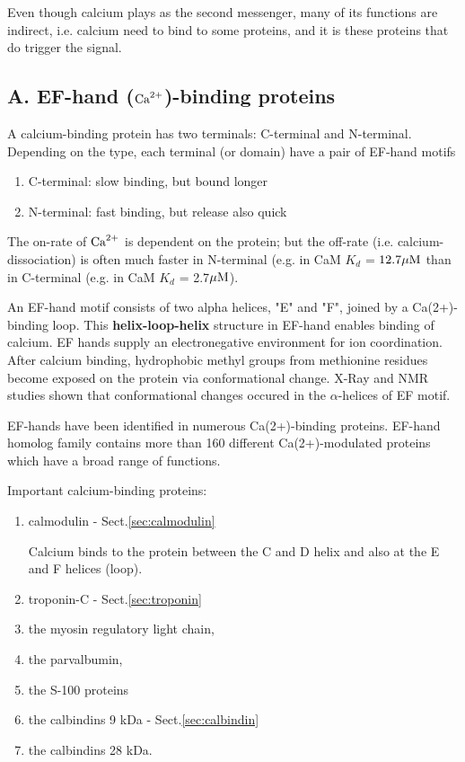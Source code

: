 Even though calcium plays as the second messenger, many of its functions are
indirect, i.e. calcium need to bind to some proteins, and it is these proteins
that do trigger the signal. 

\subsection{A. EF-hand (${\text{Ca}^{2+}}$)-binding proteins}
\label{sec:calcium-binding-proteins-EF-hand}
\label{sec:EF-hand-motif}

A calcium-binding protein has two terminals: C-terminal and N-terminal.
Depending on the type, each terminal (or domain) have a pair of EF-hand
motifs
\begin{enumerate}
  \item C-terminal: slow binding, but bound longer
  
  \item N-terminal: fast binding, but release also quick
\end{enumerate}
The on-rate of ${\text{Ca}^{2+}}$ is dependent on the protein; but the off-rate (i.e.
calcium-dissociation) is often much faster in N-terminal (e.g. in CaM $K_d$
= $12.7 {\mu\text{M}}$ than in C-terminal (e.g. in CaM $K_d$ = 2.7${\mu\text{M}}$).

An EF-hand motif consists of two alpha helices, "E" and "F", joined by a
Ca(2+)-binding loop. This {\bf helix-loop-helix} structure in EF-hand enables
binding of calcium. EF hands supply an electronegative environment for ion
coordination. After calcium binding, hydrophobic methyl groups from methionine
residues become exposed on the protein via conformational change. X-Ray and NMR
studies shown that conformational changes occured in the
 $\alpha$-helices of EF motif.


EF-hands have been identified in numerous Ca(2+)-binding
proteins. EF-hand homolog family contains more than 160 different
Ca(2+)-modulated proteins which have a broad range of functions. 

Important calcium-binding proteins:
\begin{enumerate}
  \item calmodulin - Sect.\ref{sec:calmodulin}

  Calcium binds to the protein between the C and D helix and also at the
E and F helices (loop). 

  \item troponin-C - Sect.\ref{sec:troponin}
  \item the myosin regulatory light chain, 

  \item the parvalbumin, 
  \item  the S-100 proteins  
  \item the calbindins 9 kDa - Sect.\ref{sec:calbindin}
  \item the calbindins 28 kDa.
\end{enumerate}


